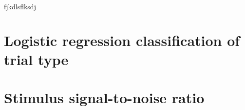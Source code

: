 \begin{figure}[htbp]
{} 
\label{fig:basic-analysis}
\end{figure}

fjkdlsflksdj





\section{Logistic regression classification of trial type}



\section{Stimulus signal-to-noise ratio}


